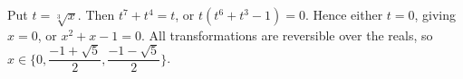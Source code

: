 Put $t=\sqrt[3]x$. Then $t^7+t^4=t$, or $t(t^6+t^3-1)=0$. Hence either $t=0$, giving $x=0$, or $x^2+x-1=0$. All transformations are reversible over the reals, so $\boxed{x\in\{0,\dfrac{-1+\sqrt5}{2},\dfrac{-1-\sqrt5}{2}\}}$.
